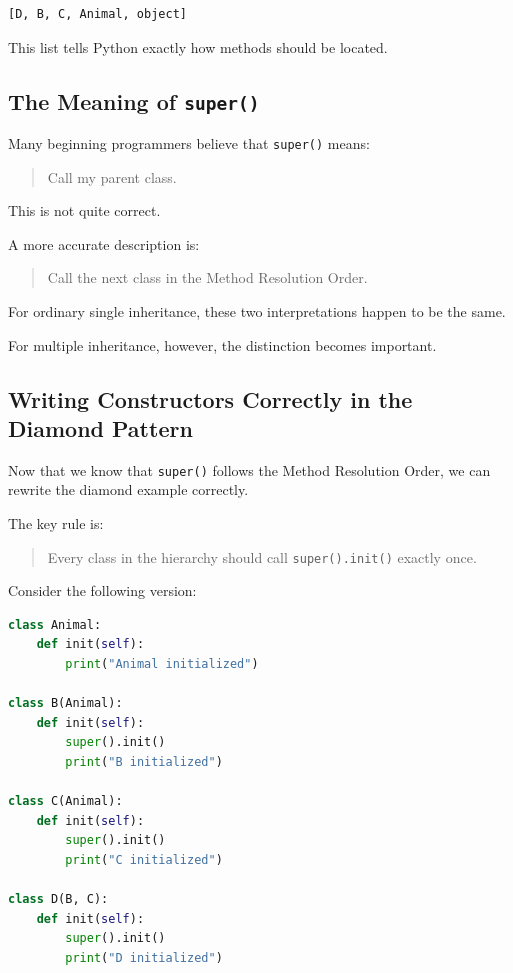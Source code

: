 \documentclass[11pt]{article}
\begin{document}
\begin{verbatim}
[D, B, C, Animal, object]
\end{verbatim}

This list tells Python exactly how methods should be located.

\subsection{The Meaning of \texttt{super()}}

Many beginning programmers believe that \texttt{super()} means:

\begin{quote}
Call my parent class.
\end{quote}

This is not quite correct.

A more accurate description is:

\begin{quote}
Call the next class in the Method Resolution Order.
\end{quote}

For ordinary single inheritance, these two interpretations happen to be the same.

For multiple inheritance, however, the distinction becomes important.

\subsection{Writing Constructors Correctly in the Diamond Pattern}

Now that we know that \verb|super()| follows the Method Resolution Order, we can rewrite the diamond example correctly.

The key rule is:

\begin{quote}
Every class in the hierarchy should call \verb|super().init()| exactly once.
\end{quote}

\newpage

Consider the following version:

\begin{lstlisting}[language=Python]
class Animal:
    def init(self):
        print("Animal initialized")

class B(Animal):
    def init(self):
        super().init()
        print("B initialized")

class C(Animal):
    def init(self):
        super().init()
        print("C initialized")

class D(B, C):
    def init(self):
        super().init()
        print("D initialized")
\end{lstlisting}
\end{document}
